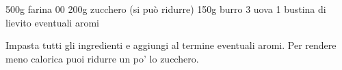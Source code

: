 \label{frolla}
\begin{ingreds}
	500g farina 00
	200g zucchero (si può ridurre)
	150g burro
	3 uova
	1 bustina di lievito
	eventuali aromi



\end{ingreds}

\begin{method}
Impasta tutti gli ingredienti e aggiungi al termine eventuali aromi. Per rendere meno calorica puoi ridurre un po' lo zucchero.



\end{method}




